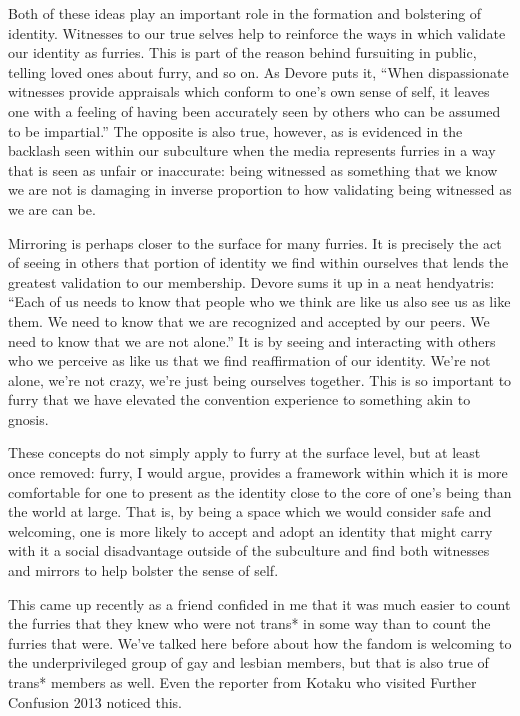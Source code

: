 Both of these ideas play an important role in the formation and bolstering of identity. Witnesses to our true selves help to reinforce the ways in which validate our identity as furries. This is part of the reason behind fursuiting in public, telling loved ones about furry, and so on. As Devore puts it, ``When dispassionate witnesses provide appraisals which conform to one's own sense of self, it leaves one with a feeling of having been accurately seen by others who can be assumed to be impartial.'' The opposite is also true, however, as is evidenced in the backlash seen within our subculture when the media represents furries in a way that is seen as unfair or inaccurate: being witnessed as something that we know we are not is damaging in inverse proportion to how validating being witnessed as we are can be.

Mirroring is perhaps closer to the surface for many furries. It is precisely the act of seeing in others that portion of identity we find within ourselves that lends the greatest validation to our membership. Devore sums it up in a neat hendyatris: ``Each of us needs to know that people who we think are like us also see us as like them. We need to know that we are recognized and accepted by our peers. We need to know that we are not alone.'' It is by seeing and interacting with others who we perceive as like us that we find reaffirmation of our identity. We're not alone, we're not crazy, we're just being ourselves together. This is so important to furry that we have elevated the convention experience to something akin to gnosis.

These concepts do not simply apply to furry at the surface level, but at least once removed: furry, I would argue, provides a framework within which it is more comfortable for one to present as the identity close to the core of one's being than the world at large. That is, by being a space which we would consider safe and welcoming, one is more likely to accept and adopt an identity that might carry with it a social disadvantage outside of the subculture and find both witnesses and mirrors to help bolster the sense of self.

This came up recently as a friend confided in me that it was much easier to count the furries that they knew who were not trans* in some way than to count the furries that were. We've talked here before about how the fandom is welcoming to the underprivileged group of gay and lesbian members, but that is also true of trans* members as well. Even the reporter from Kotaku who visited Further Confusion 2013 noticed this.


